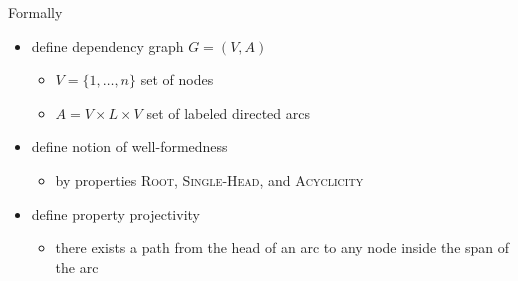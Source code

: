 \documentclass[10pt]{beamer}%
\theoremstyle{remark}
\begin{document}
\begin{frame}
  \pause%

  Formally

  \begin{itemize}[<+->]
    \item define \alert{dependency graph} $G=(V,A)$
      \begin{itemize}
        \item $V=\{1,\ldots,n\}$ set of nodes
        \item $A = V\times L \times V$ set of labeled directed arcs
      \end{itemize}
    \item define notion of \alert{well-formedness}
      \begin{itemize}
        \item by properties \textsc{Root}, \textsc{Single-Head}, and \textsc{Acyclicity}
      \end{itemize}
    \item define property \alert{projectivity}
      \begin{itemize}
        \item there exists a path from the head of an arc to any node inside the span of the arc
      \end{itemize}
  \end{itemize}
\end{frame}
\end{document}
